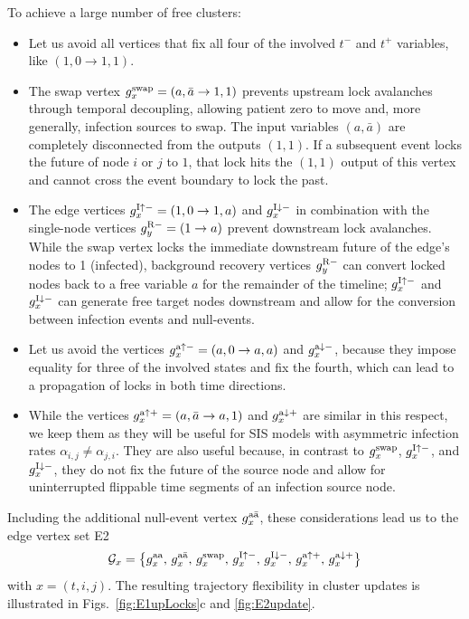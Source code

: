 \documentclass[english,10pt,aps,pra,twocolumn,superscriptaddress,floatfix,fleqn]{revtex4-2}
\newcommand{\mc}[1]{\mathcal{#1}}
\newcommand{\G} {\mc{G}}
\newcommand{\tR}{\textnormal{R}}
\newcommand{\tI}{\textnormal{I}}
\newcommand{\ta}{\textnormal{a}}
\newcommand{\bta}{\bar{\textnormal{a}}}
\newcommand{\taa}{\textnormal{aa}}
\newcommand{\swap}{\textnormal{swap}}
\let\up\uparrow
\let\dw\downarrow
\begin{document}
To achieve a large number of free clusters:
\begin{itemize}
 \item 
 Let us avoid all vertices that fix all four of the involved $t^-$ and $t^+$ variables, like $(1,0\to 1,1)$.
 \item
 The swap vertex $g^\swap_x=(a,\bar{a}\to 1,1)$ prevents upstream lock avalanches through temporal decoupling, allowing patient zero to move and, more generally, infection sources to swap. The input variables $(a,\bar{a})$ are completely disconnected from the outputs $(1,1)$. If a subsequent event locks the future of node $i$ or $j$ to $1$, that lock hits the $(1,1)$ output of this vertex and cannot cross the event boundary to lock the past.
 \item
 The edge vertices $g^{\tI\up-}_x=(1,0\to 1,a)$ and $g^{\tI\dw-}_x$ in combination with the single-node vertices $g^{\tR-}_y=(1\to a)$ prevent downstream lock avalanches. While the swap vertex locks the immediate downstream future of the edge's nodes to 1 (infected), background recovery vertices $g^{\tR-}_y$ can convert locked nodes back to a free variable $a$ for the remainder of the timeline; $g^{\tI\up-}_x$ and $g^{\tI\dw-}_x$ can generate free target nodes downstream and allow for the conversion between infection events and null-events.
 \item
 Let us avoid the vertices $g^{\ta\up-}_x=(a,0\to a,a)$ and $g^{\ta\dw-}_x$, because they impose equality for three of the involved states and fix the fourth, which can lead to a propagation of locks in both time directions.
 \item 
 While the vertices $g^{\ta\up+}_x=(a,\bar{a}\to a,1)$ and $g^{\ta\dw+}_x$ are similar in this respect, we keep them as they will be useful for SIS models with asymmetric infection rates $\alpha_{i,j}\neq\alpha_{j,i}$. They are also useful because, in contrast to $g^\swap_x$, $g^{\tI\up-}_x$, and $g^{\tI\dw-}_x$, they do not fix the future of the source node and allow for uninterrupted flippable time segments of an infection source node.
\end{itemize}

Including the additional null-event vertex $g^{\ta\bta}_x$, these considerations lead us to the edge vertex set \textsc{E2}
\begin{equation}
	\G_x=\left\{g^\taa_x,\, g^{\ta\bta}_x,\, g^\swap_x,\, g^{\tI\up-}_x,\, g^{\tI\dw-}_x,\, g^{\ta\up+}_x,\, g^{\ta\dw+}_x\right\}
\end{equation}
with $x=(t,i,j)$. The resulting trajectory flexibility in cluster updates is illustrated in Figs.~\ref{fig:E1upLocks}c and \ref{fig:E2update}.
\end{document}
